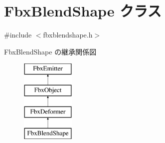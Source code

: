 \hypertarget{class_fbx_blend_shape}{}\section{Fbx\+Blend\+Shape クラス}
\label{class_fbx_blend_shape}


{\ttfamily \#include $<$fbxblendshape.\+h$>$}

Fbx\+Blend\+Shape の継承関係図\begin{figure}[H]
\begin{center}
\leavevmode
\includegraphics[height=4.000000cm]{class_fbx_blend_shape}
\end{center}
\end{figure}
